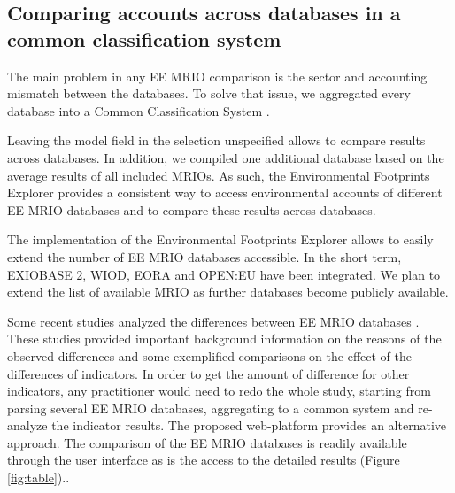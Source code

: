 \subsection{Comparing accounts across databases in a common classification system}

The main problem in any EE MRIO comparison is the sector and accounting
mismatch between the databases. To solve that issue, we aggregated every
database into a Common Classification System \cite{Steen_Olsen_2014}. 

Leaving the model field in the selection unspecified allows to compare results across databases. 
In addition, we compiled one additional database based on the average results of all included MRIOs.
As such, the Environmental Footprints Explorer provides a consistent way to access environmental accounts of different EE MRIO databases and to compare these results across databases.

The implementation of the Environmental Footprints Explorer allows to easily extend the number of EE MRIO databases accessible. In the short term, EXIOBASE 2, WIOD, EORA and OPEN:EU  have been integrated. We plan to extend the list of available MRIO as further databases become publicly available. 

Some recent studies analyzed the differences between EE MRIO databases \cite{Stadler_2014, Owen_2014, Moran_2014}. These studies provided important background information on the reasons of the observed differences and some exemplified comparisons on the effect of the differences of indicators. In order to get the amount of difference for other indicators, any practitioner would need to redo the whole study, starting from parsing several EE MRIO databases, aggregating to a common system and re-analyze the indicator results. 
The proposed web-platform provides an alternative approach. The comparison of the EE MRIO databases is readily available through the user interface as is the access to the detailed results (Figure \ref{fig:table})..
